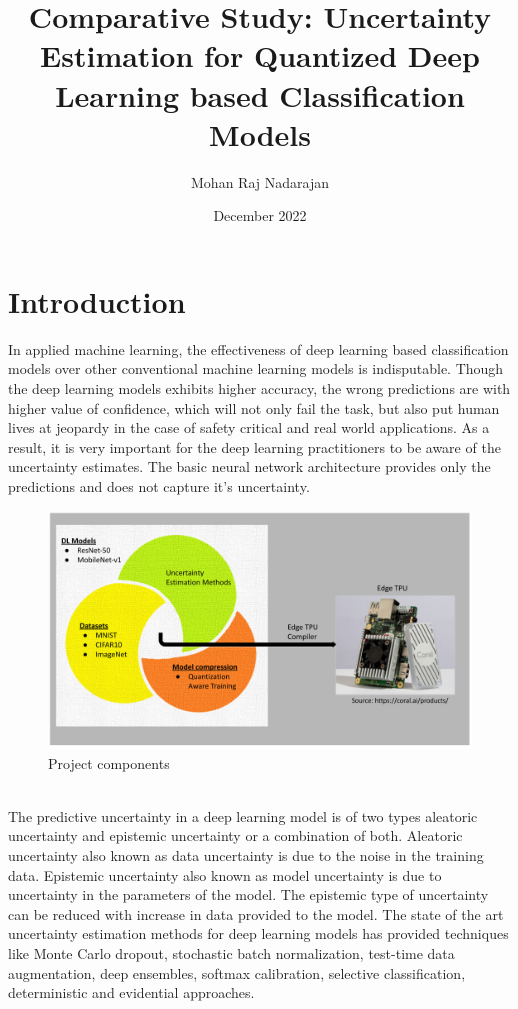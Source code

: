 \documentclass[rnd]{mas_proposal}
\title{Comparative Study: Uncertainty Estimation for Quantized Deep Learning based Classification Models}
\author{Mohan Raj Nadarajan}
\date{December 2022}
\begin{document}
\maketitle
\pagestyle{plain}
\section{Introduction}
In applied machine learning, the effectiveness of deep learning based classification models over other conventional machine learning models is indisputable. Though the deep learning models  exhibits higher accuracy, the wrong predictions are with higher value of confidence, which will not only fail the task, but also put human lives at jeopardy in the case of safety critical and real world applications\cite{gawlikowski2021survey}. As a result, it is very important for the deep learning practitioners to be aware of the uncertainty estimates. The basic neural network architecture provides only the predictions and does not capture it's uncertainty\cite{dropout}. 
\begin{figure}[h!]
    \includegraphics[width=\textwidth]{images/VennDiagram_V1.png}
    \caption{Project components}
    \label{fig:myfigure}
\end{figure}
\\
The predictive uncertainty in a deep learning model is of two types aleatoric uncertainty and epistemic uncertainty or a combination of both\cite{ue_qunatification}. Aleatoric uncertainty also known as data uncertainty is due to the noise in the training data. Epistemic uncertainty also known as model uncertainty is due to uncertainty in the parameters of the model. The epistemic type of uncertainty can be reduced with increase in data provided to the model. The state of the art uncertainty estimation methods for deep learning models has provided techniques like Monte Carlo dropout, stochastic batch normalization, test-time data augmentation, deep ensembles, softmax calibration, selective classification, deterministic and evidential approaches.
\end{document}
